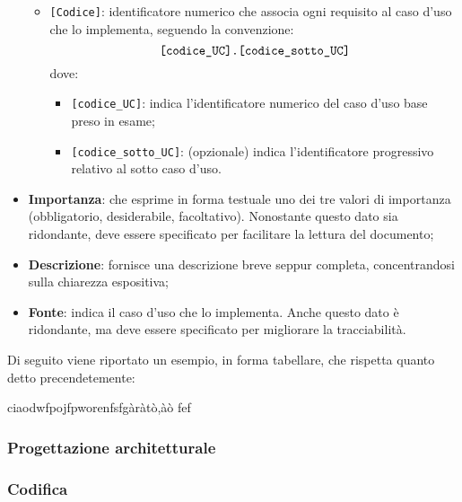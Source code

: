 \begin{itemize}
\begin{itemize}
\begin{itemize}
                \end{itemize}
            \item \texttt{[Codice]}: identificatore numerico che associa ogni requisito al caso d'uso che lo implementa, seguendo la convenzione:
            $$\text{\texttt{[codice\_UC].[codice\_sotto\_UC]}}$$
            dove:
                \begin{itemize}
                    \item \texttt{[codice\_UC]}: indica l'identificatore numerico del caso d'uso base preso in esame;
                    \item \texttt{[codice\_sotto\_UC]}: (opzionale) indica l'identificatore progressivo relativo al sotto caso d'uso.
                \end{itemize}
        \end{itemize}
        \item \textbf{Importanza}: che esprime in forma testuale uno dei tre valori di importanza (obbligatorio, desiderabile, facoltativo). Nonostante questo dato sia ridondante, deve essere specificato per facilitare la lettura del documento;     
        \item \textbf{Descrizione}: fornisce una descrizione breve seppur completa, concentrandosi sulla chiarezza espositiva;
        \item \textbf{Fonte}: indica il caso d'uso che lo implementa. Anche questo dato è ridondante, ma deve essere specificato per migliorare la tracciabilità. 
    \end{itemize}

    \noindent Di seguito viene riportato un esempio, in forma tabellare, che rispetta quanto detto precendetemente:
    \begin{tcolorbox}
        ciaodwfpojfpworenfsfgàràtò,àò
        fef
        
    \end{tcolorbox}
    

    
    

    \subsubsection{Progettazione architetturale} \label{sec:pa}
    \subsubsection{Codifica} \label{sec:coding}
    